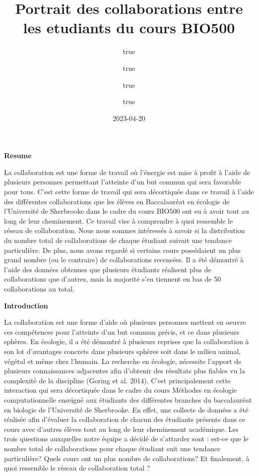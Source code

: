 \documentclass[
]{article}
\title{Portrait des collaborations entre les etudiants du cours BIO500}
\author{true \and true \and true \and true}
\date{2023-04-20}
\begin{document}
\maketitle

\textbf{Resume}

La collaboration est une forme de travail où l'énergie est mise à profit
à l'aide de plusieurs personnes permettant l'atteinte d'un but commun
qui sera favorable pour tous. C'est cette forme de travail qui sera
décortiquée dans ce travail à l'aide des différentes collaborations que
les élèves en Baccalauréat en écologie de l'Université de Sherbrooke
dans le cadre du cours BIO500 ont eu à avoir tout au long de leur
cheminement. Ce travail vise à comprendre à quoi ressemble le réseau de
collaboration. Nous nous sommes intéressés à savoir si la distribution
du nombre total de collaborations de chaque étudiant suivait une
tendance particulière. De plus, nous avons regardé si certains cours
possédaient un plus grand nombre (ou le contraire) de collaborations
recensées. Il a été démontré à l'aide des données obtenues que plusieurs
étudiants réalisent plus de collaborations que d'autres, mais la
majorité s'en tiennent en bas de 50 collaborations au total.

\textbf{Introduction}

La collaboration est une forme d'aide où plusieurs personnes mettent en
oeuvre ces compétences pour l'atteinte d'un but commun précis, et ce
dans plusieurs sphères. En écologie, il a été démontré à plusieurs
reprises que la collaboration à son lot d'avantages concrets dans
plusieurs sphères soit dans le milieu animal, végétal et même chez
l'humain. La recherche en écologie, nécessite l'apport de plusieurs
connaissances adjacentes afin d'obtenir des résultats plus fiables vu la
complexité de la discipline (Goring et al. 2014). C'est principalement
cette interaction qui sera décortiquée dans le cadre du cours Méthodes
en écologie computationnelle enseigné aux étudiants des différentes
branches du baccalauréat en biologie de l'Université de Sherbrooke. En
effet, une collecte de données a été réalisée afin d'évaluer la
collaboration de chacun des étudiants présents dans ce cours avec
d'autres élèves tout au long de leur cheminement académique. Les trois
questions auxquelles notre équipe a décidé de s'attarder sont : est-ce
que le nombre total de collaborations pour chaque étudiant suit une
tendance particulière? Quels cours ont un plus nombre de collaborations?
Et finalement, à quoi ressemble le réseau de collaboration total ?
\end{document}
